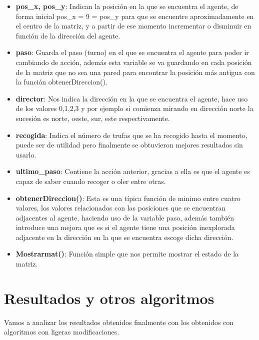 \documentclass[a4paper, 11pt]{article} %
\begin{document}
\begin{itemize}
\item \textbf{pos\_x, pos\_y}: Indican la posición en la que se encuentra el agente, de forma inicial pos\_x = 9 = pos\_y para que se encuentre aproximadamente en el centro de la matriz, y a partir de ese momento incrementar o disminuir en función de la dirección del agente.
\item \textbf{paso}: Guarda el paso (turno) en el que se encuentra el agente para poder ir cambiando de acción, además esta variable se va guardando en cada posición de la matriz que no sea una pared para encontrar la posición más antigua con la función obtenerDireccion().
\item \textbf{director}: Nos indica la dirección en la que se encuentra el agente, hace uso de los valores 0,1,2,3 y por ejemplo si comienza mirando en dirección norte la sucesión es norte, oeste, sur, este respectivamente.
\item \textbf{recogida}: Indica el número de trufas que se ha recogido hasta el momento, puede ser de utilidad pero finalmente se obtuvieron mejores resultados sin usarlo.
\item \textbf{ultimo\_paso}: Contiene la acción anterior, gracias a ella es que el agente es capaz de saber cuando recoger o oler entre otras.
\item \textbf{obtenerDireccion()}: Esta es una típica función de minimo entre cuatro valores, los valores relacionados con las posiciones que se encuentran adjacentes al agente, haciendo uso de la variable paso, además también introduce una mejora que es si el agente tiene una posición inexplorada adjacente en la dirección en la que se encuentra escoge dicha dirección.
\item \textbf{Mostrarmat()}: Función simple que nos permite mostrar el estado de la matriz.
\end{itemize}
\section{Resultados y otros algoritmos}
Vamos a analizar los resultados obtenidos finalmente con los obtenidos con algoritmos con ligeras modificaciones. 
\end{document}
